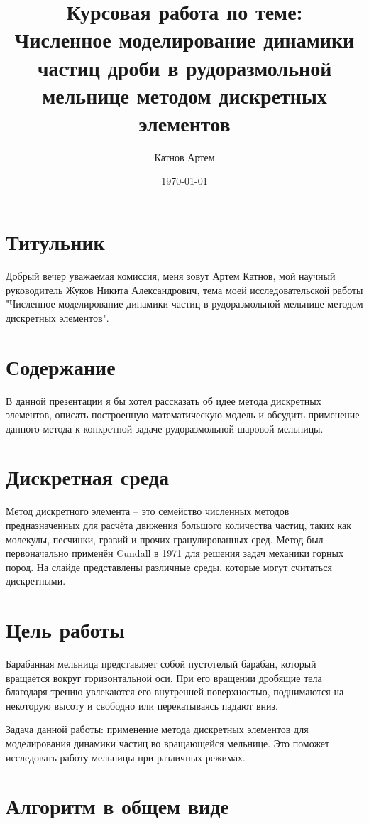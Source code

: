 \documentclass[a4paper]{article}
\author{Катнов Артем}
\title{Курсовая работа по теме: \\ Численное моделирование динамики частиц дроби в рудоразмольной мельнице методом дискретных элементов}
\date{\today}
\begin{document}
\section{Титульник}

Добрый вечер уважаемая комиссия, меня зовут Артем Катнов, мой научный руководитель Жуков Никита Александрович, тема моей исследовательской работы "Численное моделирование динамики частиц в рудоразмольной мельнице методом дискретных элементов".

\section{Содержание}

В данной презентации я бы хотел рассказать об идее метода дискретных элементов, описать построенную математическую модель и обсудить применение данного метода к конкретной задаче рудоразмольной шаровой мельницы.

\section{Дискретная среда}

Метод дискретного элемента -- это семейство численных методов предназначенных для расчёта движения большого количества частиц, таких как молекулы, песчинки, гравий и прочих гранулированных сред.
Метод был первоначально применён Cundall в 1971 для решения задач механики горных пород.
На слайде представлены различные среды, которые могут считаться дискретными.

\section{Цель работы}

Барабанная мельница представляет собой пустотелый барабан, который вращается вокруг горизонтальной оси.
При его вращении дробящие тела  благодаря трению увлекаются его внутренней поверхностью, поднимаются на некоторую высоту и свободно или перекатываясь падают вниз.

Задача данной работы: применение метода дискретных элементов для моделирования динамики частиц во вращающейся мельнице. 
Это поможет исследовать работу мельницы при различных режимах.

\section{Алгоритм в общем виде}
\end{document}

